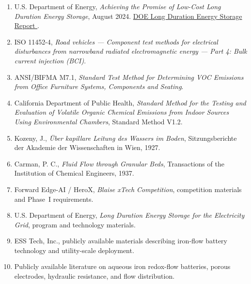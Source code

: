 \documentclass[11pt,letterpaper]{article}
\begin{document}
\begin{enumerate}[leftmargin=2em,itemsep=4pt]

\item U.S. Department of Energy,
\textit{Achieving the Promise of Low-Cost Long Duration Energy Storage},
August 2024.
\href{
https://www.energy.gov/sites/default/files/2024-08/Achieving\%20the\%20Promise\%20of\%20Low-Cost\%20Long\%20Duration\%20Energy\%20Storage_FINAL_08052024.pdf
}{
DOE Long Duration Energy Storage Report
}.

\item ISO 11452-4,
\textit{Road vehicles --- Component test methods for electrical disturbances
from narrowband radiated electromagnetic energy --- Part 4: Bulk current
injection (BCI)}.

\item ANSI/BIFMA M7.1,
\textit{Standard Test Method for Determining VOC Emissions from Office
Furniture Systems, Components and Seating}.

\item California Department of Public Health,
\textit{Standard Method for the Testing and Evaluation of Volatile Organic
Chemical Emissions from Indoor Sources Using Environmental Chambers},
Standard Method V1.2.

\item Kozeny, J.,
\textit{Über kapillare Leitung des Wassers im Boden},
Sitzungsberichte der Akademie der Wissenschaften in Wien, 1927.

\item Carman, P. C.,
\textit{Fluid Flow through Granular Beds},
Transactions of the Institution of Chemical Engineers, 1937.

\item Forward Edge-AI / HeroX,
\textit{Blaise xTech Competition},
competition materials and Phase~I requirements.

\item U.S. Department of Energy,
\textit{Long Duration Energy Storage for the Electricity Grid},
program and technology materials.

\item ESS Tech, Inc.,
publicly available materials describing iron-flow battery technology and
utility-scale deployment.

\item Publicly available literature on aqueous iron redox-flow batteries,
porous electrodes, hydraulic resistance, and flow distribution.

\end{enumerate}

\end{document}
